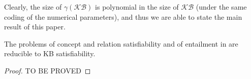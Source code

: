 \documentclass[envcountsame,draft]{llncs}
\newcommand{\nb}[1]{\textcolor{red}{\textdagger}\marginpar{\scriptsize\raggedright\textcolor{red}{#1}}}
\newcommand{\KB}{\ensuremath{\mathcal{KB}}\xspace}
\begin{document}
Clearly, the size of $\gamma(\KB)$ is polynomial in the size of $\KB$
(under the same coding of the numerical parameters), and thus we are
able to state the main result of this paper.\nb{A: the Lemma must be
  moved to another Section!}

\begin{lemma}
	The problems of concept and relation satisfiability and of entailment in \DLRpm are reducible to \DLRpm KB satisfiability.
\end{lemma}

\begin{proof}
TO BE PROVED
%	
\end{proof}
\end{document}
